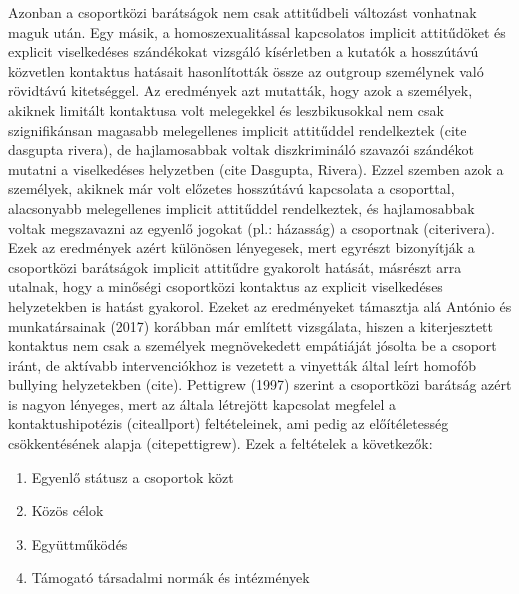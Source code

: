 Azonban a csoportközi barátságok nem csak attitűdbeli változást vonhatnak maguk után. Egy másik, a homoszexualitással kapcsolatos implicit attitűdöket és explicit viselkedéses szándékokat vizsgáló kísérletben a kutatók a hosszútávú közvetlen kontaktus hatásait hasonlították össze az outgroup személynek való rövidtávú kitetséggel. Az eredmények azt mutatták, hogy azok a személyek, akiknek limitált kontaktusa volt melegekkel és leszbikusokkal nem csak szignifikánsan magasabb melegellenes implicit attitűddel rendelkeztek (cite dasgupta rivera), de hajlamosabbak voltak diszkrimináló szavazói szándékot mutatni a viselkedéses helyzetben (cite Dasgupta, Rivera). Ezzel szemben azok a személyek, akiknek már volt előzetes hosszútávú kapcsolata a csoporttal, alacsonyabb melegellenes implicit attitűddel rendelkeztek, és hajlamosabbak voltak megszavazni az egyenlő jogokat (pl.: házasság) a csoportnak (citerivera). Ezek az eredmények azért különösen lényegesek, mert egyrészt bizonyítják a csoportközi barátságok implicit attitűdre gyakorolt hatását, másrészt arra utalnak, hogy a minőségi csoportközi kontaktus az explicit viselkedéses helyzetekben is hatást gyakorol. Ezeket az eredményeket támasztja alá António és munkatársainak (2017) korábban már említett vizsgálata, hiszen a kiterjesztett kontaktus nem csak a személyek megnövekedett empátiáját jósolta be a csoport iránt, de aktívabb intervenciókhoz is vezetett a vinyetták által leírt homofób bullying helyzetekben (cite). Pettigrew (1997) szerint a csoportközi barátság azért is nagyon lényeges, mert az általa létrejött kapcsolat megfelel a kontaktushipotézis (citeallport) feltételeinek, ami pedig az előítéletesség csökkentésének alapja (citepettigrew).  Ezek a feltételek a következők:
\begin{enumerate}
	\item Egyenlő státusz a csoportok közt
	\item Közös célok
	\item Együttműködés
	\item Támogató társadalmi normák és intézmények
\end{enumerate}

